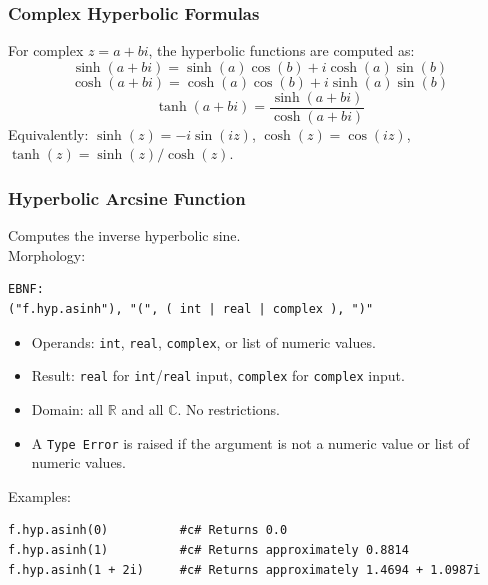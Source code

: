 \subsubsection{Complex Hyperbolic Formulas}
For complex $z = a + bi$, the hyperbolic functions are computed as:
\[
\sinh(a + bi) = \sinh(a)\cos(b) + i\cosh(a)\sin(b)
\]
\[
\cosh(a + bi) = \cosh(a)\cos(b) + i\sinh(a)\sin(b)
\]
\[
\tanh(a + bi) = \frac{\sinh(a + bi)}{\cosh(a + bi)}
\]
Equivalently: $\sinh(z) = -i \sin(iz)$, $\cosh(z) = \cos(iz)$, $\tanh(z) = \sinh(z) / \cosh(z)$.

\subsubsection{Hyperbolic Arcsine Function}
Computes the inverse hyperbolic sine. \\
Morphology:
\begin{verbatim}
EBNF:
("f.hyp.asinh"), "(", ( int | real | complex ), ")"
\end{verbatim}
\begin{itemize}
\item Operands: \texttt{int}, \texttt{real}, \texttt{complex}, or list of numeric values.
\item Result: \texttt{real} for \texttt{int}/\texttt{real} input, \texttt{complex} for \texttt{complex} input.
\item Domain: all $\mathbb{R}$ and all $\mathbb{C}$. No restrictions.
\item A \texttt{Type Error} is raised if the argument is not a numeric value or list of numeric values.
\end{itemize}
Examples:
\begin{verbatim}
f.hyp.asinh(0)          #c# Returns 0.0
f.hyp.asinh(1)          #c# Returns approximately 0.8814
f.hyp.asinh(1 + 2i)     #c# Returns approximately 1.4694 + 1.0987i
\end{verbatim}

